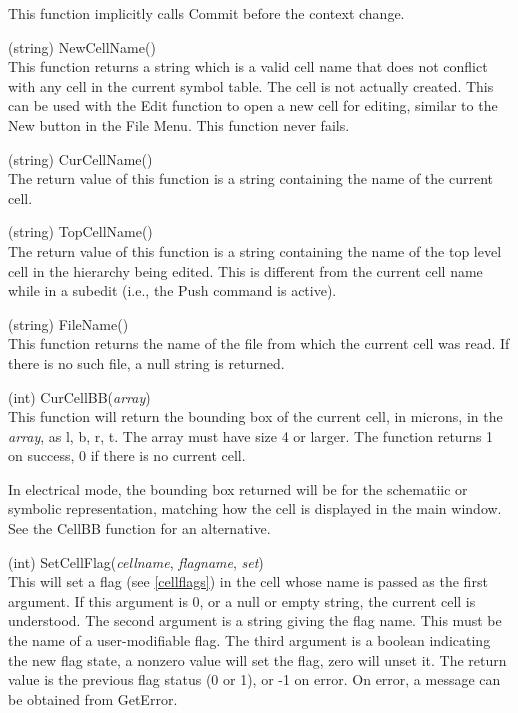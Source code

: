 \begin{description}
This function implicitly calls {\vt Commit} before the context change.

\item{(string) \vt NewCellName()}\\
This function returns a string which is a valid cell name that does
not conflict with any cell in the current symbol table.  The cell is
not actually created.  This can be used with the {\vt Edit} function
to open a new cell for editing, similar to the {\cb New} button in the
{\cb File Menu}.  This function never fails.

\item{(string) \vt CurCellName()}\\
The return value of this function is a string containing the name of
the current cell.

\item{(string) \vt TopCellName()}\\
The return value of this function is a string containing the name of
the top level cell in the hierarchy being edited.  This is different
from the current cell name while in a subedit (i.e., the {\cb Push}
command is active).

\item{(string) \vt FileName()}\\
This function returns the name of the file from which the current cell
was read.  If there is no such file, a null string is returned.

\item{(int) \vt CurCellBB({\it array\/})}\\
This function will return the bounding box of the current cell, in
microns, in the {\it array}, as l, b, r, t.  The array must have size 4
or larger.  The function returns 1 on success, 0 if there is no
current cell.

In electrical mode, the bounding box returned will be for the
schematiic or symbolic representation, matching how the cell is
displayed in the main window.  See the {\vt CellBB} function for
an alternative.

\item{(int) \vt SetCellFlag({\it cellname\/}, {\it flagname\/}, {\it set\/})}\\
This will set a flag (see \ref{cellflags}) in the cell whose name is
passed as the first argument.  If this argument is 0, or a null or
empty string, the current cell is understood.  The second argument is
a string giving the flag name.  This must be the name of a
user-modifiable flag.  The third argument is a boolean indicating the
new flag state, a nonzero value will set the flag, zero will unset it. 
The return value is the previous flag status (0 or 1), or -1 on error. 
On error, a message can be obtained from {\vt GetError}.
 

\end{description}
